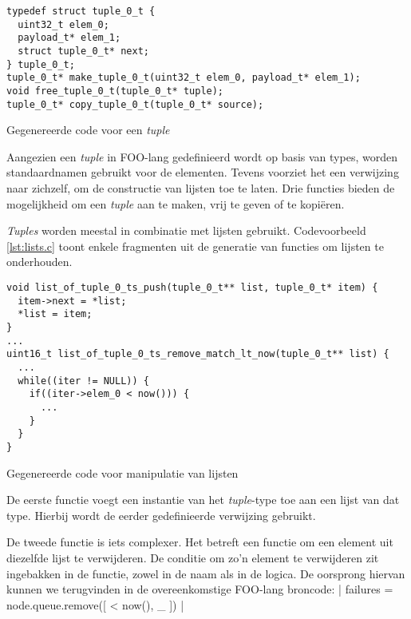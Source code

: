 \begin{listing}[ht]
  \begin{verbatim}
typedef struct tuple_0_t {
  uint32_t elem_0;
  payload_t* elem_1;
  struct tuple_0_t* next;
} tuple_0_t;
tuple_0_t* make_tuple_0_t(uint32_t elem_0, payload_t* elem_1);
void free_tuple_0_t(tuple_0_t* tuple);
tuple_0_t* copy_tuple_0_t(tuple_0_t* source);
  \end{verbatim}
  \vspace{-5mm}
  \caption{Gegenereerde code voor een \emph{tuple}}
  \label{lst:tuples.h}
\end{listing}

Aangezien een \emph{tuple} in FOO-lang gedefinieerd wordt op basis van types,
worden standaardnamen gebruikt voor de elementen. Tevens voorziet het een
verwijzing naar zichzelf, om de constructie van lijsten toe te laten. Drie
functies bieden de mogelijkheid om een \emph{tuple} aan te maken, vrij te geven
of te kopi\"eren.

\emph{Tuples} worden meestal in combinatie met lijsten gebruikt. Codevoorbeeld
\ref{lst:lists.c} toont enkele fragmenten uit de generatie van functies om lijsten
te onderhouden.

\begin{listing}[ht]
  \begin{verbatim}
void list_of_tuple_0_ts_push(tuple_0_t** list, tuple_0_t* item) {
  item->next = *list;
  *list = item;
}
...
uint16_t list_of_tuple_0_ts_remove_match_lt_now(tuple_0_t** list) {
  ...
  while((iter != NULL)) {
    if((iter->elem_0 < now())) {
      ...
    }
  }
}
  \end{verbatim}
  \vspace{-5mm}
  \caption{Gegenereerde code voor manipulatie van lijsten}
  \label{lst:lists.c}
\end{listing}

De eerste functie voegt een instantie van het \emph{tuple}-type toe aan een
lijst van dat type. Hierbij wordt de eerder gedefinieerde verwijzing gebruikt.

De tweede functie is iets complexer. Het betreft een functie om een element uit
diezelfde lijst te verwijderen. De conditie om zo'n element te verwijderen zit
ingebakken in de functie, zowel in de naam als in de logica. De oorsprong
hiervan kunnen we terugvinden in de overeenkomstige FOO-lang broncode:
| failures = node.queue.remove([ < now(), _ ]) |

